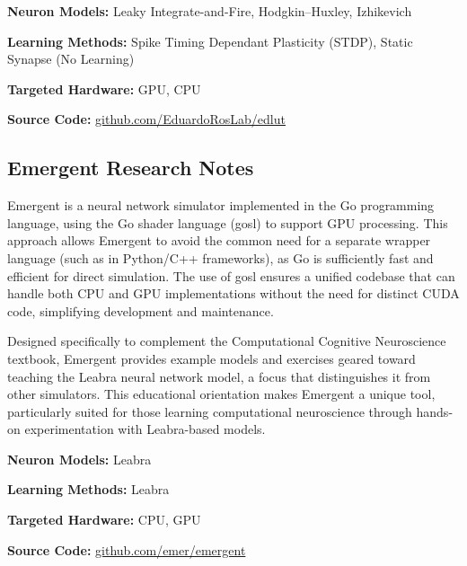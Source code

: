 \begin{tcolorbox}[enhanced,attach boxed title to top center={yshift=-3mm,yshifttext=-1mm}, colback=blue!5!white,colframe=blue!75!black,colbacktitle=red!80!black, title=EDLUT at a Glance,fonttitle=\bfseries, boxed title style={size=small,colframe=red!50!black} ]

\textbf{Neuron Models:} Leaky Integrate-and-Fire, Hodgkin–Huxley, Izhikevich

\textbf{Learning Methods:} Spike Timing Dependant Plasticity (STDP), Static Synapse (No Learning)  

\textbf{Targeted Hardware:} GPU, CPU 

\textbf{Source Code:} \href{https://github.com/EduardoRosLab/edlut}{github.com/EduardoRosLab/edlut}
\end{tcolorbox}
\subsection*{Emergent Research Notes}\label{Emergent}

Emergent is a neural network simulator implemented in the Go programming language, using the Go shader language (gosl) to support GPU processing. This approach allows Emergent to avoid the common need for a separate wrapper language (such as in Python/C++ frameworks), as Go is sufficiently fast and efficient for direct simulation. The use of gosl ensures a unified codebase that can handle both CPU and GPU implementations without the need for distinct CUDA code, simplifying development and maintenance.

Designed specifically to complement the Computational Cognitive Neuroscience textbook, Emergent provides example models and exercises geared toward teaching the Leabra neural network model, a focus that distinguishes it from other simulators. This educational orientation makes Emergent a unique tool, particularly suited for those learning computational neuroscience through hands-on experimentation with Leabra-based models.

\begin{tcolorbox}[enhanced,attach boxed title to top center={yshift=-3mm,yshifttext=-1mm}, colback=blue!5!white,colframe=blue!75!black,colbacktitle=red!80!black, title=Emergent at a Glance,fonttitle=\bfseries, boxed title style={size=small,colframe=red!50!black} ]

\textbf{Neuron Models:} Leabra

\textbf{Learning Methods:} Leabra  

\textbf{Targeted Hardware:} CPU, GPU 

\textbf{Source Code:} \href{https://github.com/emer/emergent}{github.com/emer/emergent}
\end{tcolorbox}

